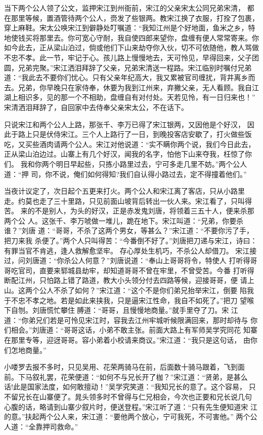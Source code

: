 当下两个公人领了公文，监押宋江到州衙前，宋江的父亲宋太公同兄弟宋清，
都在那里等候，置酒管待两个公人，赍发了些银两。教宋江换了衣服，打拴了包裹，
穿上麻鞋。宋太公唤宋江到僻静处叮嘱道：“我知江州是个好地面，鱼米之乡，特
地使钱买将那里去。你可宽心守耐，我自使四郎来望你，盘缠有便人常常寄来。你
如今此去，正从梁山泊过，倘或他们下山来劫夺你入伙，切不可依随他，教人骂做
不忠不孝。此一节，牢记于心。孩儿路上慢慢地去，天可怜见，早得回来，父子团
圆，兄弟完聚。”宋江洒泪拜辞了父亲，兄弟宋清送一程路。宋江临别时嘱付兄弟
道：“我此去不要你们忧心。只有父亲年纪高大，我又累被官司缠扰，背井离乡而
去。兄弟，你早晚只在家侍奉，休要为我到江州来，弃撇父亲，无人看顾。我自江
湖上相识多，见的那一个不相助，盘缠自有对付处。天若见怜，有一日归来也！”
宋清洒泪拜辞了，自回家中去侍奉父亲宋太公，不在话下。

只说宋江和两个公人上路，那张千、李万已得了宋江银两，又因他是个好汉，
因此于路上只是伏侍宋江。三个人上路行了一日，到晚投客店安歇了，打火做些饭
吃，又买些酒肉请两个公人。宋江对他说道：“实不瞒你两个说，我们今日此去，
正从梁山泊边过。山寨上有几个好汉，闻我的名字，怕他下山来夺我，枉惊了你们。
我和你两个明日早起些，只拣小路里过去，宁可多走几里不妨。”两个公人道：“押
司，你不说，俺们如何得知?我们自认得小路过去，定不得撞着他们。”

当夜计议定了，次日起个五更来打火。两个公人和宋江离了客店，只从小路里
走。约莫也走了三十里路，只见前面山坡背后转出一伙人来。宋江看了，只叫得苦。
来的不是别人，为头的好汉，正是赤发鬼刘唐，将领着三五十人，便来杀那两个公
人。这张千、李万唬做一堆儿，跪在地下。宋江叫道：“兄弟，你要杀谁？”刘唐
道：“哥哥，不杀了这两个男女，等甚么？”宋江道：“不要你污了手，把刀来我
杀便了。”两个人只叫得苦：“今番倒不好了。”刘唐把刀递与宋江，诗曰：
有罪当官不肯逃，逢人救解愈坚牢。
存心厚处生机巧，不杀公人却借刀。
宋江接过，问刘唐道：“你杀公人何意？”刘唐说道：“奉山上哥哥将令，特使人
打听得哥哥吃官司，直要来郓城县劫牢，却知道哥哥不曾在牢里，不曾受苦。今番
打听得断配江州，只怕路上错了路道，教大小头领分付去四路等候，迎接哥哥，便
请上山。这两个公人不杀了如何？”宋江道：“这个不是你们弟兄抬举宋江，倒要
陷我于不忠不孝之地。若是如此来挟我，只是逼宋江性命，我自不如死了。”把刀
望喉下自刎。刘唐慌忙攀住膊道：“哥哥，且慢慢地商量。”就手里夺了刀。宋
江道：“你弟兄们若是可怜见宋江时，容我去江州牢城听候限满回来，那时却待与
你们相会。”刘唐道：“哥哥这话，小弟不敢主张。前面大路上有军师吴学究同花
知寨在那里专等，迎迓哥哥。容小弟着小校请来商议。”宋江道：“我只是这句话，
由你们怎地商量。”

小喽罗去报不多时，只见吴用、花荣两骑马在前，后面数十骑马跟着，飞到面
前。下马叙礼罢，花荣便道：“如何不与兄长开了枷？”宋江道：“贤弟，是甚么
话!此是国家法度，如何敢擅动！”吴学究笑道：“我知兄长的意了。这个容易，
只不留兄长在山寨便了。晁头领多时不曾得与仁兄相会，今次也正要和兄长说几句
心腹的话，略请到山寨少叙片时，便送登程。”宋江听了道：“只有先生便知道宋
江的意。”扶起两个公人来，宋江道：“要他两个放心，宁可我死，不可害他。”
两个公人道：“全靠押司救命。”

